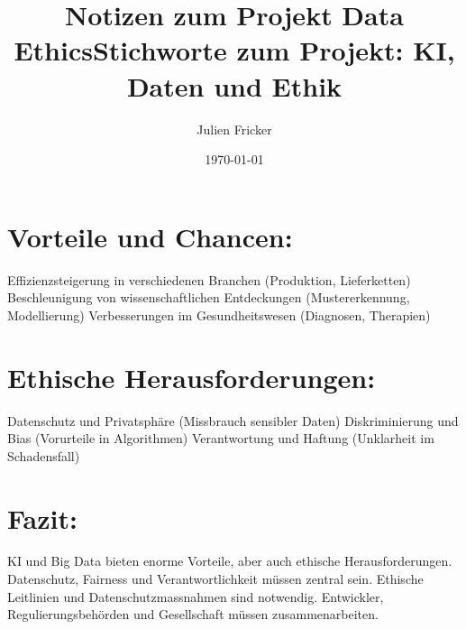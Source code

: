 \documentclass{article}
\title{Notizen zum Projekt Data Ethics}
\author{Julien Fricker}
\date{\today}
\begin{document}
\maketitle
\title{Stichworte zum Projekt: KI, Daten und Ethik}

\section{Vorteile und Chancen:}

Effizienzsteigerung in verschiedenen Branchen (Produktion, Lieferketten)
Beschleunigung von wissenschaftlichen Entdeckungen (Mustererkennung, Modellierung)
Verbesserungen im Gesundheitswesen (Diagnosen, Therapien)

\section{Ethische Herausforderungen:}

Datenschutz und Privatsphäre (Missbrauch sensibler Daten)
Diskriminierung und Bias (Vorurteile in Algorithmen)
Verantwortung und Haftung (Unklarheit im Schadensfall)

\section{Fazit:}

KI und Big Data bieten enorme Vorteile, aber auch ethische Herausforderungen.
Datenschutz, Fairness und Verantwortlichkeit müssen zentral sein.
Ethische Leitlinien und Datenschutzmassnahmen sind notwendig.
Entwickler, Regulierungsbehörden und Gesellschaft müssen zusammenarbeiten.
\end{document}
